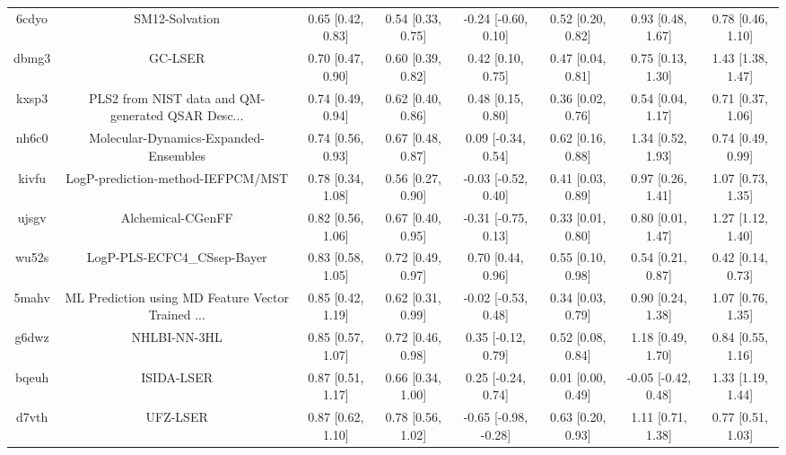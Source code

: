 \documentclass{article}
\begin{document}
\begin{center}
\begin{longtable}{|cccccccc|}
 6cdyo &                                     SM12-Solvation &  0.65 [0.42, 0.83] &  0.54 [0.33, 0.75] &   -0.24 [-0.60, 0.10] &  0.52 [0.20, 0.82] &    0.93 [0.48, 1.67] &     0.78 [0.46, 1.10] \\
 dbmg3 &                                            GC-LSER &  0.70 [0.47, 0.90] &  0.60 [0.39, 0.82] &     0.42 [0.10, 0.75] &  0.47 [0.04, 0.81] &    0.75 [0.13, 1.30] &     1.43 [1.38, 1.47] \\
 kxsp3 &  PLS2 from NIST data and QM-generated QSAR Desc... &  0.74 [0.49, 0.94] &  0.62 [0.40, 0.86] &     0.48 [0.15, 0.80] &  0.36 [0.02, 0.76] &    0.54 [0.04, 1.17] &     0.71 [0.37, 1.06] \\
 nh6c0 &              Molecular-Dynamics-Expanded-Ensembles &  0.74 [0.56, 0.93] &  0.67 [0.48, 0.87] &    0.09 [-0.34, 0.54] &  0.62 [0.16, 0.88] &    1.34 [0.52, 1.93] &     0.74 [0.49, 0.99] \\
 kivfu &                  LogP-prediction-method-IEFPCM/MST &  0.78 [0.34, 1.08] &  0.56 [0.27, 0.90] &   -0.03 [-0.52, 0.40] &  0.41 [0.03, 0.89] &    0.97 [0.26, 1.41] &     1.07 [0.73, 1.35] \\
 ujsgv &                                  Alchemical-CGenFF &  0.82 [0.56, 1.06] &  0.67 [0.40, 0.95] &   -0.31 [-0.75, 0.13] &  0.33 [0.01, 0.80] &    0.80 [0.01, 1.47] &     1.27 [1.12, 1.40] \\
 wu52s &                        LogP-PLS-ECFC4\_CSsep-Bayer &  0.83 [0.58, 1.05] &  0.72 [0.49, 0.97] &     0.70 [0.44, 0.96] &  0.55 [0.10, 0.98] &    0.54 [0.21, 0.87] &     0.42 [0.14, 0.73] \\
 5mahv &  ML Prediction using MD Feature Vector Trained ... &  0.85 [0.42, 1.19] &  0.62 [0.31, 0.99] &   -0.02 [-0.53, 0.48] &  0.34 [0.03, 0.79] &    0.90 [0.24, 1.38] &     1.07 [0.76, 1.35] \\
 g6dwz &                                       NHLBI-NN-3HL &  0.85 [0.57, 1.07] &  0.72 [0.46, 0.98] &    0.35 [-0.12, 0.79] &  0.52 [0.08, 0.84] &    1.18 [0.49, 1.70] &     0.84 [0.55, 1.16] \\
 bqeuh &                                         ISIDA-LSER &  0.87 [0.51, 1.17] &  0.66 [0.34, 1.00] &    0.25 [-0.24, 0.74] &  0.01 [0.00, 0.49] &  -0.05 [-0.42, 0.48] &     1.33 [1.19, 1.44] \\
 d7vth &                                           UFZ-LSER &  0.87 [0.62, 1.10] &  0.78 [0.56, 1.02] &  -0.65 [-0.98, -0.28] &  0.63 [0.20, 0.93] &    1.11 [0.71, 1.38] &     0.77 [0.51, 1.03] \\

\end{longtable}
\end{center}
\end{document}
